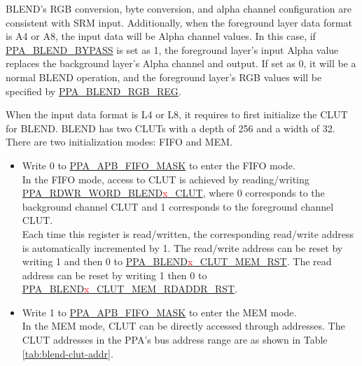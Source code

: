\documentclass[main\_\_EN.tex]{subfiles}
\begin{document}
BLEND's RGB conversion, byte conversion, and alpha channel configuration are consistent with SRM input. Additionally, when the foreground layer data format is A4 or A8, the input data will be Alpha channel values. In this case, if \hyperref[fielddesc:PPABLENDBYPASS]{PPA\_BLEND\_BYPASS} is set as 1, the foreground layer's input Alpha value replaces the background layer's Alpha channel and output. If set as 0, it will be a normal BLEND operation, and the foreground layer's RGB values will be specified by \hyperref[regdesc:PPABLENDRGBREG]{PPA\_BLEND\_RGB\_REG}.

When the input data format is L4 or L8, it requires to first initialize the CLUT for BLEND. BLEND has two CLUTs with a depth of 256 and a width of 32. There are two initialization modes: FIFO and MEM.

\begin{itemize}
    \item Write 0 to \hyperref[fielddesc:PPAAPBFIFOMASK]{PPA\_APB\_FIFO\_MASK} to enter the FIFO mode. \\
    In the FIFO mode, access to CLUT is achieved by reading/writing \hyperref[fielddesc:PPARDWRWORDBLEND0CLUT]{PPA\_RDWR\_WORD\_BLEND\textcolor{red}{x}\_CLUT}, where 0 corresponds to the background channel CLUT and 1 corresponds to the foreground channel CLUT. \\
    Each time this register is read/written, the corresponding read/write address is automatically incremented by 1. The read/write address can be reset by writing 1 and then 0 to \hyperref[fielddesc:PPABLEND0CLUTMEMRST]{PPA\_BLEND\textcolor{red}{x}\_CLUT\_MEM\_RST}. The read address can be reset by writing 1 then 0 to \hyperref[fielddesc:PPABLEND0CLUTMEMRDADDRRST]{PPA\_BLEND\textcolor{red}{x}\_CLUT\_MEM\_RDADDR\_RST}.
    \item Write 1 to \hyperref[fielddesc:PPAAPBFIFOMASK]{PPA\_APB\_FIFO\_MASK} to enter the MEM mode. \\
    In the MEM mode, CLUT can be directly accessed through addresses. The CLUT addresses in the PPA's bus address range are as shown in Table \ref{tab:blend-clut-addr}.
\end{itemize}
\end{document}
